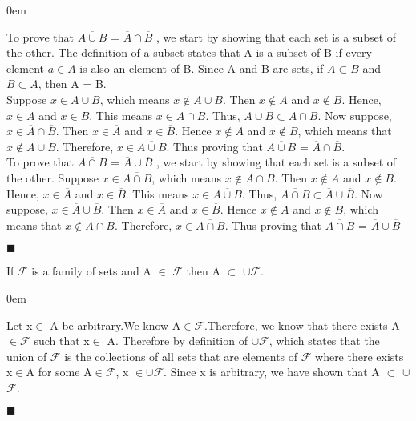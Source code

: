 \documentclass[12pt]{article}
\renewcommand{\qed}{\hfill$\blacksquare$}
\renewenvironment{proof}{\begin{addmargin}[1em]{0em}\begin{newproof}}{\end{newproof}\end{addmargin}\qed}
\newenvironment{theorem}[2][Theorem]{\begin{trivlist}
\item[\hskip \labelsep {\bfseries #1}\hskip \labelsep {\bfseries #2.}]}{\end{trivlist}}
\begin{document}
\begin{proof}
	To prove that $\overline{A \cup B}$ = $\overline{A} \cap \overline{B}$ , we start by showing that each set is a subset of the other. The definition of a subset states that A is a subset of B if every element $a \in A$ is also an element of B. Since A and B are sets, if $A \subset B$ and $B \subset A$, then A = B. \\
	
    Suppose $x \in \overline{A \cup B}$, which means $x \notin A \cup B$. Then $x \notin A$ and $x \notin B$. Hence, $x \in \overline{A}$ and $x \in \overline{B}$. This means $x \in \overline{A \cap B}$. Thus, $\overline{A \cup B} \subset \overline{A} \cap \overline{B}$. Now suppose, $x \in \overline{A} \cap \overline{B}$. Then $x \in \overline{A}$ and $x \in \overline{B}$. Hence $x \notin A$ and $x \notin B$, which means that $x \notin A \cup B$. Therefore, $x \in \overline{A \cup B}$. Thus proving that $\overline{A \cup B}$ = $\overline{A} \cap \overline{B}$.\\

	To prove that $\overline{A \cap B}$ = $\overline{A} \cup \overline{B}$ , we start by showing that each set is a subset of the other. Suppose $x \in \overline{A \cap B}$, which means $x \notin A \cap B$. Then $x \notin A$ and $x \notin B$. Hence, $x \in \overline{A}$ and $x \in \overline{B}$. This means $x \in \overline{A \cup B}$. Thus, $\overline{A \cap B} \subset \overline{A} \cup \overline{B}$. Now suppose, $x \in \overline{A} \cup \overline{B}$. Then $x \in \overline{A}$ and $x \in \overline{B}$. Hence $x \notin A$ and $x \notin B$, which means that $x \notin A \cap B$. Therefore, $x \in \overline{A \cap B}$. Thus proving that $\overline{A \cap B}$ = $\overline{A} \cup \overline{B}$
\end{proof}

\begin{theorem}{3.2}
If $\mathcal{F}$ is a family of sets and A $\in$ $\mathcal{F}$ then A $\subset$ $\cup$$\mathcal{F}$.

\end{theorem}

\begin{proof}[Proof]
Let x$\in$ A be arbitrary.We know A$\in$$\mathcal{F}$.Therefore, we know that there exists A $\in$$\mathcal{F}$ such that x$\in$ A. Therefore by definition of $\cup$$\mathcal{F}$, which states that the union of $\mathcal{F}$ is the collections of all sets that are elements of $\mathcal{F}$ where there exists x$\in$A for some A$\in$$\mathcal{F}$, x $\in$$\cup$$\mathcal{F}$. Since x is arbitrary, we have shown that A $\subset$ $\cup$$\mathcal{F}$.

\end{proof}
\end{document}
